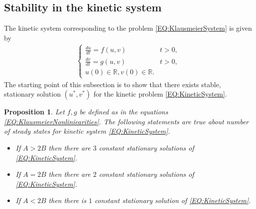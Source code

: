 \documentclass[12pt, a4paper]{article}
\theoremstyle{break}
\theoremstyle{break}
\newtheorem{prp}{Proposition}[section]
\theoremstyle{break}
\theoremstyle{break}
\theoremstyle{break}
\theoremstyle{break}
\theoremstyle{break}
\begin{document}
\subsection{Stability in the kinetic system}

The kinetic system corresponding to the problem \eqref{EQ:KlausmeierSystem} is given by
\begin{align}
    \label{EQ:KineticSystem}
    \begin{cases}
        \frac{du}{dt} = f(u, v) &t > 0,\\
        \frac{dv}{dt} = g(u, v) &t > 0,\\
        u(0) \in \mathbb{R}, v(0) \in \mathbb{R}.
    \end{cases}
\end{align}
The starting point of this subsection is to show that there exists stable, stationary solution $(u^*, v^*)$ for the kinetic problem \eqref{EQ:KineticSystem}.
\begin{prp}
    \label{prp:ExistenceOfConstantSSKineticSystem}
    Let $f, g$ be defined as in the equations \eqref{EQ:KlausmeierNonliniearities}. The following statements are true about number of steady states for kinetic system \eqref{EQ:KineticSystem}.
    \begin{itemize}
        \item If $A > 2B$ then there are $3$ constant stationary solutions of \eqref{EQ:KineticSystem}.
        \item If $A = 2B$ then there are $2$ constant stationary solutions of \eqref{EQ:KineticSystem}.
        \item If $A < 2B$ then there is $1$ constant stationary solution of \eqref{EQ:KineticSystem}.
    \end{itemize}
\end{prp}
\end{document}
